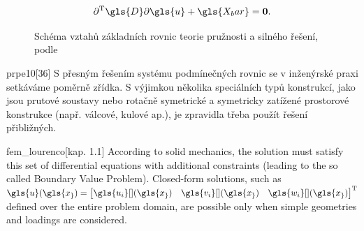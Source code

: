 \begin{equation}
    \label{eq:strong_form}
    \partial^{\mathrm{T}} \gls{D} \partial{\gls{u}} + \gls{X_bar} = \matr{0}.
\end{equation}

\begin{figure}[H]
    \caption[Schéma vztahů základních rovnic teorie pružnosti a silného řešení]{Schéma vztahů základních rovnic teorie pružnosti a silného řešení, podle \cite[obr. 1.2]{fem_lourenco}}
    \label{fig:elasticity_diagram}
\end{figure}


\begin{citeQuote}{prpe10}[36]
    S přesným řešením systému podmínečných rovnic se v inženýrské praxi setkáváme poměrně zřídka. S výjimkou několika speciálních typů konstrukcí, jako jsou prutové soustavy nebo rotačně symetrické a symetricky zatížené prostorové konstrukce (např. válcové, kulové ap.), je zpravidla třeba použít řešení přibližných.
\end{citeQuote}

\begin{citeQuote}{fem_lourenco}[kap. 1.1]
    According to solid mechanics, the solution must satisfy this set of differential equations with additional constraints (leading to the so called Boundary Value Problem). Closed-form solutions, such as ${\gls{u}(\gls{x_})=\begin{bmatrix}
        \gls{u_i}[ ](\gls{x_}) & \gls{v_i}[ ](\gls{x_}) & \gls{w_i}[ ](\gls{x_})
    \end{bmatrix}^{\mathrm{T}}}$ defined over the entire problem domain, are possible only when simple geometries and loadings are considered.
\end{citeQuote}